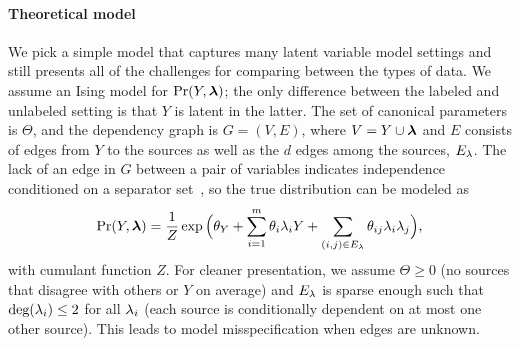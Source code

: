 
\paragraph{Theoretical model}
We pick a simple model that captures many latent variable model settings and still presents all of the challenges for comparing between the types of data. We assume an Ising model for $\Pr(Y, \bm{\lambda})$; the only difference between the labeled and unlabeled setting is that $Y$ is latent in the latter. %
The set of canonical parameters is $\Theta$, and the dependency graph is $G = (V, E)$, where $V = Y \cup \bm{\lambda}$ and $E$ consists of edges from $Y$ to the sources as well as the $d$ edges among the sources, $E_{\lambda}$. %
The lack of an edge in $G$ between a pair of
variables indicates independence conditioned on a separator set~\citep{Lauritzen}, so the true distribution can be modeled as
\begin{align}
    \Pr(Y, \bm{\lf}) = \frac{1}{Z} \exp \Big(\theta_Y + \sum_{i = 1}^m \theta_i \lf_i Y + \sum_{(i, j) \in E_{\lf}} \theta_{ij} \lf_i \lf_j \Big),
    \label{eq:true_pgm} \nonumber 
    \vspace{-0.5em}
\end{align}
with cumulant function $Z$. For cleaner presentation, we assume $\Theta \ge 0$ (no sources that disagree with others or $Y$ on average) and $E_{\lambda}$ is sparse enough such that $\text{deg}(\lambda_i) \le 2$ for all $\lambda_i$ (each source is conditionally dependent on at most one other source). This leads to model misspecification when edges are unknown.


